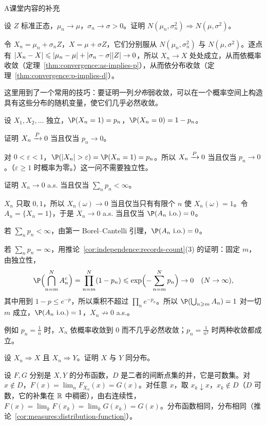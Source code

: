 \begin{exercises}{A}{课堂内容的补充}
\item\label{ex:convergence:A4} 设 $Z$ 标准正态，$\mu_n\to\mu$，$\sigma_n\to\sigma>0$。证明 $N(\mu_n,\sigma_n^2)\Rightarrow N(\mu,\sigma^2)$。
\begin{solution}
令 $X_n=\mu_n+\sigma_nZ$，$X=\mu+\sigma Z$，它们分别服从 $N(\mu_n,\sigma_n^2)$ 与 $N(\mu,\sigma^2)$。逐点有 $\lvert X_n-X\rvert\leqslant\lvert \mu_n-\mu\rvert+\lvert \sigma_n-\sigma\rvert\lvert Z\rvert\to0$，所以 $X_n\to X$ 处处成立，从而依概率收敛（定理~\ref{thm:convergence:as-implies-p}），从而依分布收敛（定理~\ref{thm:convergence:p-implies-d}）。

这里用到了一个常用的技巧：要证明一列\emph{分布}弱收敛，可以在一个概率空间上构造具有这些分布的随机变量，使它们几乎必然收敛。
\end{solution}

\item\label{ex:convergence:A5} 设 $X_1,X_2,\dots$ 独立，$\P(X_n=1)=p_n$，$\P(X_n=0)=1-p_n$。
\begin{questions}
\item 证明 $X_n\xrightarrow{P}0$ 当且仅当 $p_n\to0$。
\begin{solution}
对 $0<\varepsilon<1$，$\P(\abs{X_n}>\varepsilon)=\P(X_n=1)=p_n$。所以 $X_n\xrightarrow{P}0$ 当且仅当 $p_n\to0$。（$\varepsilon\geqslant1$ 时概率为零。）这一问不需要独立性。
\end{solution}
\item 证明 $X_n\to0$ a.s. 当且仅当 $\sum_np_n<\infty$。
\begin{solution}
$X_n$ 只取 $0,1$，所以 $X_n(\omega)\to0$ 当且仅当只有有限个 $n$ 使 $X_n(\omega)=1$。令 $A_n=\{X_n=1\}$，于是 $X_n\to0$ a.s. 当且仅当 $\P(A_n\ \text{i.o.})=0$。

若 $\sum_np_n<\infty$，由第一 Borel--Cantelli 引理，$\P(A_n\ \text{i.o.})=0$。

若 $\sum_np_n=\infty$，用推论~\ref{cor:independence:records-count}(3) 的证明：固定 $m$，由独立性，
\[
\P\Bigl(\bigcap_{n=m}^NA_n^c\Bigr)=\prod_{n=m}^N(1-p_n)\leqslant\exp\Bigl(-\sum_{n=m}^Np_n\Bigr)\to0\quad(N\to\infty),
\]
其中用到 $1-p\leqslant e^{-p}$，所以乘积不超过 $\prod_ne^{-p_n}$。所以 $\P(\bigcup_{n\geqslant m}A_n)=1$ 对一切 $m$ 成立，$\P(A_n\ \text{i.o.})=1$，$X_n\not\to0$ a.s.。

例如 $p_n=\frac1n$ 时，$X_n$ 依概率收敛到 $0$ 而不几乎必然收敛；$p_n=\frac1{n^2}$ 时两种收敛都成立。
\end{solution}
\end{questions}

\item\label{ex:convergence:A6} 设 $X_n\Rightarrow X$ 且 $X_n\Rightarrow Y$。证明 $X$ 与 $Y$ 同分布。
\begin{solution}
设 $F,G$ 分别是 $X,Y$ 的分布函数，$D$ 是二者的间断点集的并，它是可数集。对 $x\notin D$，$F(x)=\lim_nF_{X_n}(x)=G(x)$。对任意 $x$，取 $x_k\downarrow x$，$x_k\notin D$（$D$ 可数，它的补集在 $\mathbb{R}$ 中稠密），由右连续性，$F(x)=\lim_kF(x_k)=\lim_kG(x_k)=G(x)$。分布函数相同，分布相同（推论~\ref{cor:measures:distribution-function}）。
\end{solution}


\end{exercises}
